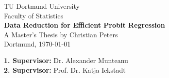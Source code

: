 \begin{titlepage}
    \begin{center}
        \LARGE{TU Dortmund University\\}
        \Large{Faculty of Statistics\\}
        \vspace{3cm}
        \LARGE{\textbf{Data Reduction for Efficient Probit Regression\\}}
        \vspace{3cm}
        \Large{A Master's Thesis by Christian Peters\\}
        \vspace{2cm}
        \Large{Dortmund, \today}
    \end{center}
    \vfill
    {\bfseries 1. Supervisor:} Dr. Alexander Munteanu\\
    {\bfseries 2. Supervisor:} Prof. Dr. Katja Ickstadt
    \thispagestyle{empty}
\end{titlepage}
